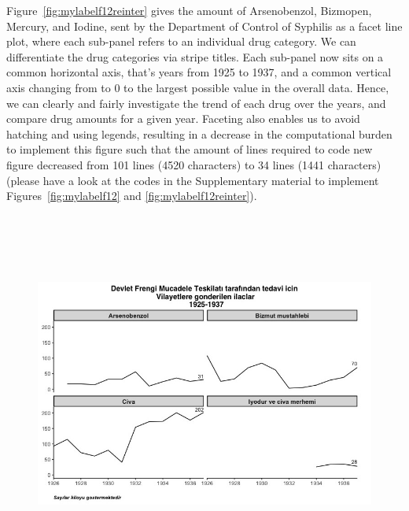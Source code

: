 Figure~\ref{fig:mylabelf12reinter} gives the amount of Arsenobenzol, Bizmopen, Mercury, and Iodine, sent by the Department of Control of Syphilis as a facet line plot, where each sub-panel refers to an individual drug category. We can differentiate the drug categories via stripe titles.  Each sub-panel now
sits on a common horizontal axis, that's years from 1925 to 1937, and a common vertical axis changing from to 0 to the largest possible value in the overall data. Hence, we can clearly and fairly investigate the trend of each drug over the years, and compare drug amounts for a given year. Faceting also enables us to avoid hatching and using legends, resulting in a decrease in the computational burden to implement this figure such that the amount of lines required to code new figure decreased from 101 lines (4520 characters) to 34 lines 
(1441 characters) (please have a look at the  codes  in the Supplementary material to implement Figures~\ref{fig:mylabelf12} and \ref{fig:mylabelf12reinter}).



\begin{figure}[hbt!]
	\centering
	\includegraphics[width=12cm,height=12cm,keepaspectratio]{frengi_reinterpreted.png}
\end{figure}



